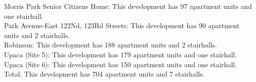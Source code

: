 {Morris Park Senior Citizens Home}: This development has 97 apartment units and one stairhall.\\{Park Avenue-East 122Nd, 123Rd Streets}: This development has 90 apartment units and 2 stairhalls.\\{Robinson}: This development has 188 apartment units and 2 stairhalls.\\{Upaca (Site 5)}: This development has 179 apartment units and one stairhall.\\{Upaca (Site 6)}: This development has 150 apartment units and one stairhall.\\{Total}: This development has 704 apartment units and 7 stairhalls.\\